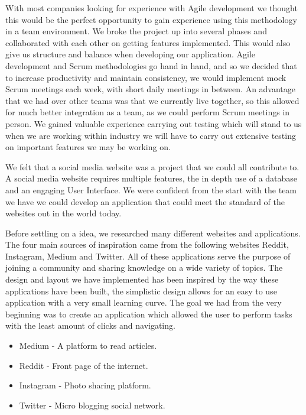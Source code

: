 With most companies looking for experience with Agile development we thought this would be the perfect opportunity to gain experience using this methodology in a team environment. We broke the project up into several phases and collaborated with each other on getting features implemented. This would also give us structure and balance when developing our application. Agile development and Scrum methodologies go hand in hand, and so we decided that to increase productivity and maintain consistency, we would implement mock Scrum meetings each week, with short daily meetings in between. An advantage that we had over other teams was that we currently live together, so this allowed for much better integration as a team, as we could perform Scrum meetings in person. We gained valuable experience carrying out testing which will stand to us when we are working within industry we will have to carry out extensive testing on important features we may be working on.
\newline

We felt that a social media website was a project that we could all contribute to. A social media website requires multiple features, the in depth use of a database and an engaging User Interface. We were confident from the start with the team we have we could develop an application that could meet the standard of the websites out in the world today.
\newline

Before settling on a idea, we researched many different websites and applications.
The four main sources of inspiration came from the following websites Reddit, Instagram, Medium and Twitter. All of these applications serve the purpose of joining a community and sharing knowledge on a wide variety of topics. The design and layout we have implemented has been inspired by the way these applications have been built, the simplistic design allows for an easy to use application with a very small learning curve. The goal we had from the very beginning was to create an application which allowed the user to perform tasks with the least amount of clicks and navigating.
\begin{itemize}
\item Medium - A platform to read articles.
\item Reddit - Front page of the internet.
\item Instagram - Photo sharing platform.
\item Twitter - Micro blogging social network.
\end{itemize}

